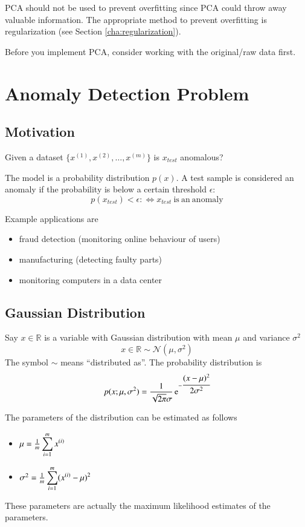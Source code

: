 \documentclass[a4paper,twoside,10pt]{article}
\begin{document}
\ac{PCA} should not be used to prevent overfitting since \ac{PCA} could throw away valuable information.
The appropriate method to prevent overfitting is regularization (see Section \ref{cha:regularization}).

Before you implement \ac{PCA}, consider working with the original/raw data first.

\section{Anomaly Detection Problem}
\subsection{Motivation}
Given a dataset $\{x^{(1)},x^{(2)},\ldots,x^{(m)}\}$ is $x_{test}$ anomalous?

The model is a probability distribution $p(x)$. A test sample is considered an anomaly if the probability is below a certain threshold $\epsilon$:
\begin{equation*}
  p(x_{test})<\epsilon:\Leftrightarrow x_{test}\mathrm{\ is\ an\ anomaly}
\end{equation*}

Example applications are
\begin{itemize}
  \item fraud detection (monitoring online behaviour of users)
  \item manufacturing (detecting faulty parts)
  \item monitoring computers in a data center
\end{itemize}

\subsection{Gaussian Distribution}
Say $x\in\mathbb{R}$ is a variable with Gaussian distribution with mean $\mu$ and variance $\sigma^2$
\begin{equation*}
x\in\mathbb{R}\sim\mathcal{N}(\mu,\sigma^2)
\end{equation*}
The symbol $\sim$ means ``distributed as''. The probability distribution is
\begin{equation*}
  p(x;\mu,\sigma^2)=\frac{1}{\sqrt{2\pi}\sigma}\operatorname{e}^{-\cfrac{(x-\mu)^2}{2\sigma^2}}
\end{equation*}

The parameters of the distribution can be estimated as follows
\begin{itemize}
  \item $\mu=\frac{1}{m}\displaystyle\sum_{i=1}^mx^{(i)}$
  \item $\sigma^2=\frac{1}{m}\displaystyle\sum_{i=1}^m(x^{(i)}-\mu)^2$
\end{itemize}
These parameters are actually the maximum likelihood estimates of the parameters.
\end{document}
